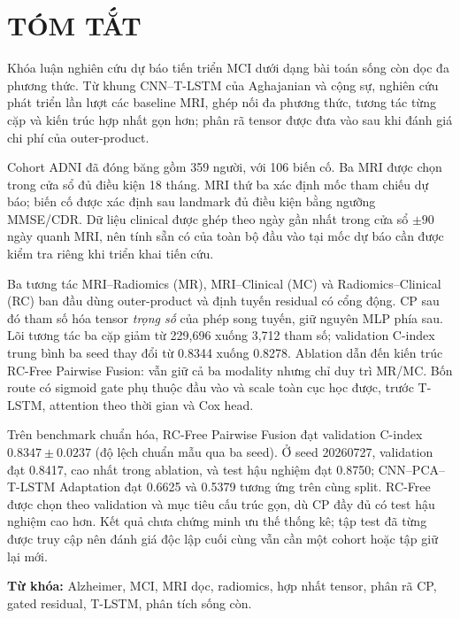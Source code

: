 \chapter*{TÓM TẮT}

Khóa luận \emph{\ThesisTitle} nghiên cứu dự báo tiến triển MCI dưới dạng bài toán sống còn dọc đa phương thức. Từ khung CNN--T-LSTM của Aghajanian và cộng sự, nghiên cứu phát triển lần lượt các baseline MRI, ghép nối đa phương thức, tương tác từng cặp và kiến trúc hợp nhất gọn hơn; phân rã tensor được đưa vào sau khi đánh giá chi phí của outer-product.

Cohort ADNI đã đóng băng gồm 359 người, với 106 biến cố. Ba MRI được chọn trong cửa sổ đủ điều kiện 18 tháng. MRI thứ ba xác định mốc tham chiếu dự báo; biến cố được xác định sau landmark đủ điều kiện bằng ngưỡng MMSE/CDR. Dữ liệu clinical được ghép theo ngày gần nhất trong cửa sổ $\pm90$ ngày quanh MRI, nên tính sẵn có của toàn bộ đầu vào tại mốc dự báo cần được kiểm tra riêng khi triển khai tiến cứu.

Ba tương tác MRI--Radiomics (MR), MRI--Clinical (MC) và Radiomics--Clinical (RC) ban đầu dùng outer-product và định tuyến residual có cổng động. CP sau đó tham số hóa tensor \emph{trọng số} của phép song tuyến, giữ nguyên MLP phía sau. Lõi tương tác ba cặp giảm từ 229,696 xuống 3,712 tham số; validation C-index trung bình ba seed thay đổi từ 0.8344 xuống 0.8278. Ablation dẫn đến kiến trúc RC-Free Pairwise Fusion: vẫn giữ cả ba modality nhưng chỉ duy trì MR/MC. Bốn route có sigmoid gate phụ thuộc đầu vào và scale toàn cục học được, trước T-LSTM, attention theo thời gian và Cox head.

Trên benchmark chuẩn hóa, RC-Free Pairwise Fusion đạt validation C-index $0.8347\pm0.0237$ (độ lệch chuẩn mẫu qua ba seed). Ở seed 20260727, validation đạt 0.8417, cao nhất trong ablation, và test hậu nghiệm đạt 0.8750; CNN--PCA--T-LSTM Adaptation đạt 0.6625 và 0.5379 tương ứng trên cùng split. RC-Free được chọn theo validation và mục tiêu cấu trúc gọn, dù CP đầy đủ có test hậu nghiệm cao hơn. Kết quả chưa chứng minh ưu thế thống kê; tập test đã từng được truy cập nên đánh giá độc lập cuối cùng vẫn cần một cohort hoặc tập giữ lại mới.

\textbf{Từ khóa:} Alzheimer, MCI, MRI dọc, radiomics, hợp nhất tensor, phân rã CP, gated residual, T-LSTM, phân tích sống còn.
